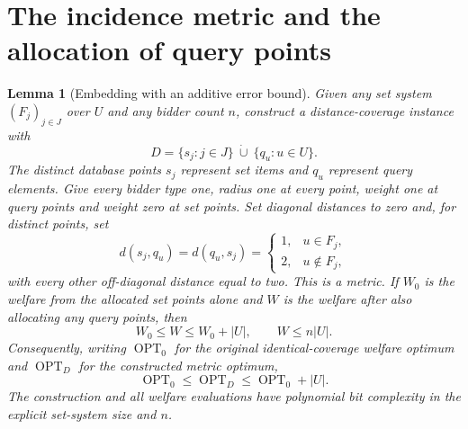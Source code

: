 \documentclass[11pt]{article}
\newtheorem{lemma}[theorem]{Lemma}
\newcommand{\OPT}{\operatorname{OPT}}
\begin{document}
\section{The incidence metric and the allocation of query points}
\begin{lemma}[Embedding with an additive error bound]\label{lem:embedding}
Given any set system $(F_j)_{j\in J}$ over $U$ and any bidder count $n$, construct a distance-coverage instance with
\[
 D=\{s_j:j\in J\}\ \dot\cup\ \{q_u:u\in U\}.
\]
The distinct database points $s_j$ represent set items and $q_u$ represent query elements. Give every bidder type one, radius one at every point, weight one at query points and weight zero at set points. Set diagonal distances to zero and, for distinct points, set
\[
 d(s_j,q_u)=d(q_u,s_j)=
 \begin{cases}1,&u\in F_j,\\2,&u\notin F_j,\end{cases}
\]
with every other off-diagonal distance equal to two. This is a metric. If $W_0$ is the welfare from the allocated set points alone and $W$ is the welfare after also allocating any query points, then
\[
 W_0\le W\le W_0+|U|,\qquad W\le n|U|.
\]
Consequently, writing $\OPT_0$ for the original identical-coverage welfare optimum and $\OPT_D$ for the constructed metric optimum,
\[
 \OPT_0\le\OPT_D\le\OPT_0+|U|.
\]
The construction and all welfare evaluations have polynomial bit complexity in the explicit set-system size and $n$.
\end{lemma}
\end{document}
